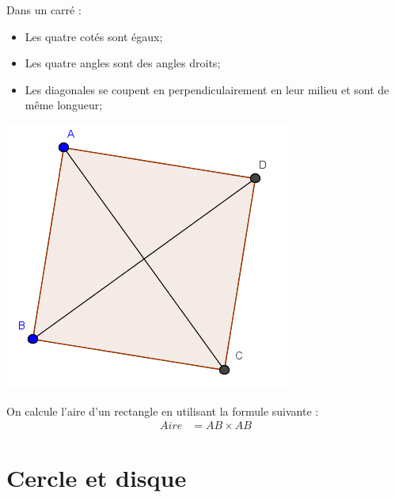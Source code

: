 \documentclass[12pt,a4paper]{article}
\begin{document}
\begin{myprops}
	
	\begin{multicols}{2}
		
		Dans un carré :
		\begin{itemize}
			\item Les quatre cotés sont égaux;
			\item Les quatre angles sont des angles droits;
			\item Les diagonales se coupent en perpendiculairement en leur milieu et sont de même longueur;
			
		\end{itemize}
		
		
		\includegraphics[scale=0.6]{./img/carre}
	\end{multicols}
	
\end{myprops}

\begin{mymeth}
	On calcule l'aire d'un rectangle en utilisant la formule suivante :
	\vspace*{-1cm}
	\begin{align*}
	Aire &= AB \times AB
	\end{align*}
\end{mymeth}

\section{Cercle et disque}
\end{document}
